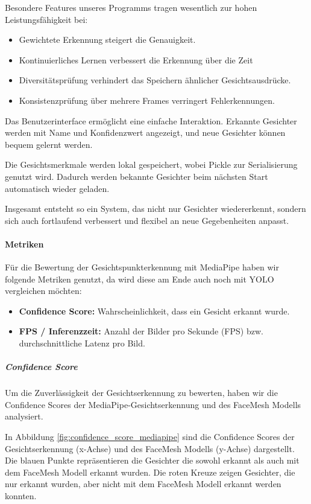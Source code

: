 Besondere Features unseres Programms tragen wesentlich zur hohen Leistungsfähigkeit bei:
\begin{itemize}
    \item Gewichtete Erkennung steigert die Genauigkeit.
    \item Kontinuierliches Lernen verbessert die Erkennung über die Zeit
    \item Diversitätsprüfung verhindert das Speichern ähnlicher Gesichtsausdrücke.
    \item Konsistenzprüfung über mehrere Frames verringert Fehlerkennungen.
\end{itemize}

Das Benutzerinterface ermöglicht eine einfache Interaktion.
Erkannte Gesichter werden mit Name und Konfidenzwert angezeigt, und neue Gesichter können bequem gelernt werden.

Die Gesichtsmerkmale werden lokal gespeichert, wobei Pickle zur Serialisierung genutzt wird. Dadurch werden bekannte Gesichter beim nächsten Start automatisch wieder geladen.

Insgesamt entsteht so ein System, das nicht nur Gesichter wiedererkennt, sondern sich auch fortlaufend verbessert und flexibel an neue Gegebenheiten anpasst.

\paragraph{Metriken}
Für die Bewertung der Gesichtspunkterkennung mit MediaPipe haben wir folgende Metriken genutzt, da wird diese am Ende auch noch mit YOLO vergleichen möchten:
\begin{itemize}
    \item \textbf{Confidence Score:} Wahrscheinlichkeit, dass ein Gesicht erkannt wurde.
    \item \textbf{FPS / Inferenzzeit:} Anzahl der Bilder pro Sekunde (FPS) bzw. durchschnittliche Latenz pro Bild.
\end{itemize}

\subparagraph{Confidence Score} 

Um die Zuverlässigkeit der Gesichtserkennung zu bewerten, haben wir die Confidence Scores der MediaPipe-Gesichtserkennung und des FaceMesh Modells analysiert.

In Abbildung \ref{fig:confidence_score_mediapipe} sind die Confidence Scores der Gesichtserkennung (x-Achse) und des FaceMesh Modells (y-Achse) dargestellt. Die blauen Punkte repräsentieren die Gesichter die sowohl erkannt als auch mit dem FaceMesh Modell erkannt wurden. 
Die roten Kreuze zeigen Gesichter, die nur erkannt wurden, aber nicht mit dem FaceMesh Modell erkannt werden konnten.

